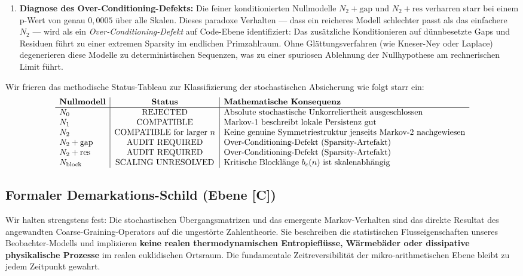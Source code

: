 \documentclass[11pt,a4paper]{article}
\theoremstyle{definition}
\begin{document}
\begin{enumerate}
		\item \textbf{Diagnose des Over-Conditioning-Defekts:}
		Die feiner konditionierten Nullmodelle $N_2+\mathrm{gap}$ und $N_2+\mathrm{res}$ verharren starr bei einem p-Wert von genau $0{,}0005$ über alle Skalen. Dieses paradoxe Verhalten — dass ein reicheres Modell schlechter passt als das einfachere $N_2$ — wird als ein \emph{Over-Conditioning-Defekt} auf Code-Ebene identifiziert: Das zusätzliche Konditionieren auf dünnbesetzte Gaps und Residuen führt zu einer extremen Sparsity im endlichen Primzahlraum. Ohne Glättungsverfahren (wie Kneser-Ney oder Laplace) degenerieren diese Modelle zu deterministischen Sequenzen, was zu einer spuriosen Ablehnung der Nullhypothese am rechnerischen Limit führt.
	\end{enumerate}
	
	Wir frieren das methodische Status-Tableau zur Klassifizierung der stochastischen Absicherung wie folgt starr ein:
	\begin{equation}
		\begin{array}{l|c|l}
			\textbf{Nullmodell} & \textbf{Status} & \textbf{Mathematische Konsequenz} \\
			\hline
			N_0 & \mathrm{REJECTED} & \text{Absolute stochastische Unkorreliertheit ausgeschlossen} \\
			N_1 & \mathrm{COMPATIBLE} & \text{Markov-1 beschreibt lokale Persistenz gut} \\
			N_2 & \mathrm{COMPATIBLE\ for\ larger\ }n & \text{Keine genuine Symmetriestruktur jenseits Markov-2 nachgewiesen} \\
			N_2+\mathrm{gap} & \mathrm{AUDIT\ REQUIRED} & \text{Over-Conditioning-Defekt (Sparsity-Artefakt)} \\
			N_2+\mathrm{res} & \mathrm{AUDIT\ REQUIRED} & \text{Over-Conditioning-Defekt (Sparsity-Artefakt)} \\
			N_{\rm block} & \mathrm{SCALING\ UNRESOLVED} & \text{Kritische Blocklänge } b_c(n) \text{ ist skalenabhängig} \\
		\end{array}
	\end{equation}
	
	\subsection{Formaler Demarkations-Schild (Ebene [C])}
	Wir halten strengstens fest: Die stochastischen Übergangsmatrizen und das emergente Markov-Verhalten sind das direkte Resultat des angewandten Coarse-Graining-Operators auf die ungestörte Zahlentheorie. Sie beschreiben die statistischen Flusseigenschaften unseres Beobachter-Modells und implizieren \textbf{keine realen thermodynamischen Entropieflüsse, Wärmebäder oder dissipative physikalische Prozesse} im realen euklidischen Ortsraum. Die fundamentale Zeitreversibilität der mikro-arithmetischen Ebene bleibt zu jedem Zeitpunkt gewahrt.
	
\end{document}
